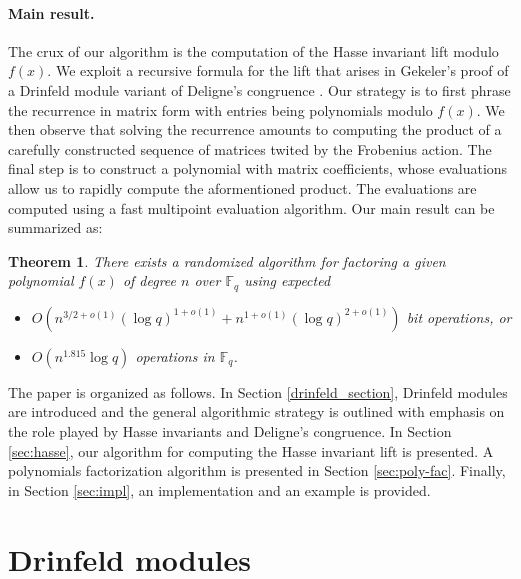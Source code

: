 \documentclass[12pt]{article}
\theoremstyle{plain}
\newtheorem{theorem}{Theorem}
\theoremstyle{definition}
\def\F{\ensuremath{\mathbb{F}}}
\begin{document}
\paragraph{Main result.}
The crux of our algorithm is the computation of the Hasse invariant lift modulo $f(x)$. We exploit 
a recursive formula for the lift that arises in Gekeler's proof of a Drinfeld module variant of 
Deligne's congruence \cite{gek}. Our strategy is to first phrase the recurrence in matrix form with 
entries being polynomials modulo $f(x)$. We then observe that solving the recurrence amounts to 
computing the product of a carefully constructed sequence of matrices twited by the Frobenius 
action. The final step is to construct a polynomial with matrix coefficients, whose evaluations 
allow us to rapidly compute the aformentioned product. The evaluations are computed using a fast 
multipoint evaluation algorithm. Our main result can be summarized as:
\begin{theorem}
	\label{theorem:main}
	There exists a randomized algorithm for factoring a given polynomial $f(x)$ of degree $n$ over 
	$\F_q$ using expected
	\begin{itemize}
		\item $O(n^{3/2+o(1)} (\log q)^{1+o(1)} + n^{1+o(1)} (\log q)^{2+o(1)})$ bit operations, or
		\item $O(n^{1.815}\log q)$ operations in $\F_q$.
	\end{itemize}
\end{theorem}


The paper is organized as follows. In Section \ref{drinfeld_section}, Drinfeld modules are 
introduced and the general algorithmic strategy is outlined with emphasis on the role played by 
Hasse invariants and Deligne's congruence. In Section \ref{sec:hasse}, our algorithm for computing 
the Hasse invariant lift is presented. A polynomials factorization algorithm is presented in 
Section \ref{sec:poly-fac}. Finally, in Section \ref{sec:impl}, an implementation and an example is 
provided.
 
 
 
 

\section{Drinfeld modules}
\end{document}
